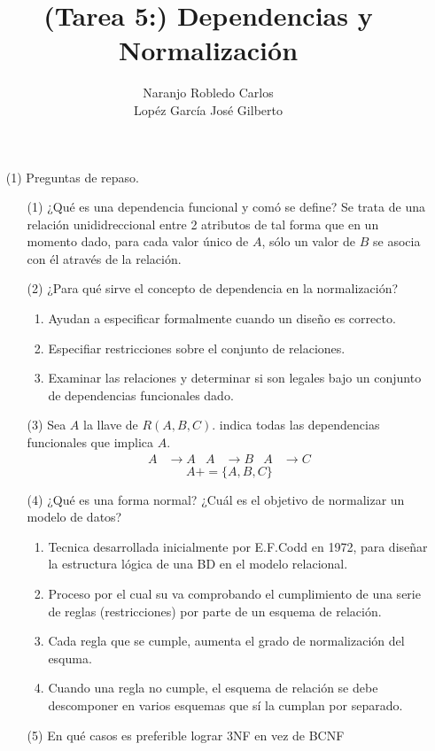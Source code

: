 \documentclass{article}
\title{(Tarea 5:) Dependencias y Normalización}
\author{Naranjo Robledo Carlos \\ Lopéz García José Gilberto}
\begin{document}
  \begin{enumerate}
    \item[(1)] Preguntas de repaso.
    \begin{enumerate}
      \item[(1)] ¿Qué es una dependencia funcional y comó se define?
      Se trata de una relación unididreccional entre 2 atributos de tal forma que
      en un momento dado, para cada valor único de $A$, sólo un valor de $B$ se
      asocia con él através de la relación.
      \item[(2)] ¿Para qué sirve el concepto de dependencia en la normalización?
        \begin{enumerate}
          \item Ayudan a especificar formalmente cuando un diseño es correcto.
          \item Especifiar restricciones sobre el conjunto de relaciones.
          \item Examinar las relaciones y determinar si son legales bajo un
          conjunto de dependencias funcionales dado.
        \end{enumerate}
      \item[(3)] Sea $A$ la llave de $R(A,B,C)$. indica todas las dependencias
      funcionales que implica $A$.
      \begin{align*}
        A &\rightarrow A & A &\rightarrow B & A &\rightarrow C
      \end{align*}
      $$ A += \{A,B,C\} $$
      \item[(4)] ¿Qué es una forma normal? ¿Cuál es el objetivo de normalizar un
      modelo de datos?
        \begin{enumerate}
          \item Tecnica desarrollada inicialmente por E.F.Codd en 1972, para diseñar la
          estructura lógica de una BD en el modelo relacional.
          \item Proceso por el cual su va comprobando el cumplimiento de una serie
          de reglas (restricciones) por parte de un esquema de relación.
          \item Cada regla que se cumple, aumenta el grado de normalización del
          esquma.
          \item Cuando una regla no cumple, el esquema de relación se debe
          descomponer en varios esquemas que sí la cumplan por separado.
        \end{enumerate}
      \item[(5)] En qué casos es preferible lograr 3NF en vez de BCNF


\end{enumerate}
\end{enumerate}
\end{document}
